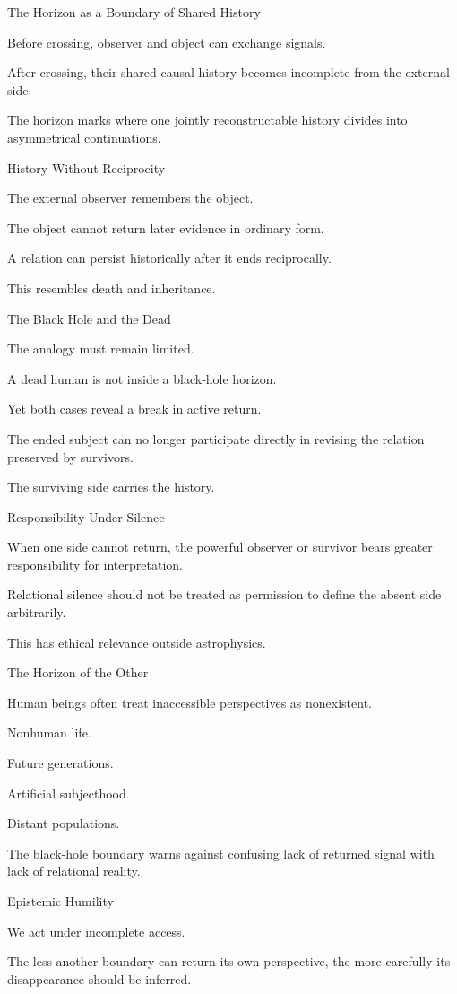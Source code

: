 The Horizon as a Boundary of Shared History

Before crossing, observer and object can exchange signals.

After crossing, their shared causal history becomes incomplete from the external side.

The horizon marks where one jointly reconstructable history divides into asymmetrical continuations.

History Without Reciprocity

The external observer remembers the object.

The object cannot return later evidence in ordinary form.

A relation can persist historically after it ends reciprocally.

This resembles death and inheritance.

The Black Hole and the Dead

The analogy must remain limited.

A dead human is not inside a black-hole horizon.

Yet both cases reveal a break in active return.

The ended subject can no longer participate directly in revising the relation preserved by survivors.

The surviving side carries the history.

Responsibility Under Silence

When one side cannot return, the powerful observer or survivor bears greater responsibility for interpretation.

Relational silence should not be treated as permission to define the absent side arbitrarily.

This has ethical relevance outside astrophysics.

The Horizon of the Other

Human beings often treat inaccessible perspectives as nonexistent.

Nonhuman life.

Future generations.

Artificial subjecthood.

Distant populations.

The black-hole boundary warns against confusing lack of returned signal with lack of relational reality.

Epistemic Humility

We act under incomplete access.

The less another boundary can return its own perspective, the more carefully its disappearance should be inferred.

